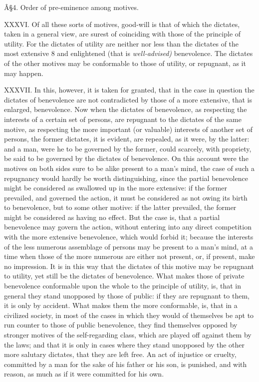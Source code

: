 \documentclass[12pt]{report}
\begin{document}
Â§4. Order of pre-eminence among motives.

XXXVI. Of all these sorts of motives, good-will is that of which the
dictates, taken in a general view, are surest of coinciding with those
of the principle of utility. For the dictates of utility are neither nor
less than the dictates of the most extensive 8 and enlightened (that is
\emph{well-advised)} benevolence. The dictates of the other motives may
be conformable to those of utility, or repugnant, as it may happen.

XXXVII. In this, however, it is taken for granted, that in the case in
question the dictates of benevolence are not contradicted by those of a
more extensive, that is enlarged, benevolence. Now when the dictates of
benevolence, as respecting the interests of a certain set of persons,
are repugnant to the dictates of the same motive, as respecting the more
important (or valuable) interests of another set of persons, the former
dictates, it is evident, are repealed, as it were, by the latter: and a
man, were he to be governed by the former, could scarcely, with
propriety, be said to be governed by the dictates of benevolence. On
this account were the motives on both sides sure to be alike present to
a man's mind, the case of such a repugnancy would hardly be worth
distinguishing, since the partial benevolence might be considered as
swallowed up in the more extensive: if the former prevailed, and
governed the action, it must be considered as not owing its birth to
benevolence, but to some other motive: if the latter prevailed, the
former might be considered as having no effect. But the case is, that a
partial benevolence may govern the action, without entering into any
direct competition with the more extensive benevolence, which would
forbid it; because the interests of the less numerous assemblage of
persons may be present to a man's mind, at a time when those of the more
numerous are either not present, or, if present, make no impression. It
is in this way that the dictates of this motive may be repugnant to
utility, yet still be the dictates of benevolence. What makes those of
private benevolence conformable upon the whole to the principle of
utility, is, that in general they stand unopposed by those of public: if
they are repugnant to them, it is only by accident. What makes them the
more conformable, is, that in a civilized society, in most of the cases
in which they would of themselves be apt to run counter to those of
public benevolence, they find themselves opposed by stronger motives of
the self-regarding class, which are played off against them by the laws;
and that it is only in cases where they stand unopposed by the other
more salutary dictates, that they are left free. An act of injustice or
cruelty, committed by a man for the sake of his father or his son, is
punished, and with reason, as much as if it were committed for his own.
\end{document}
